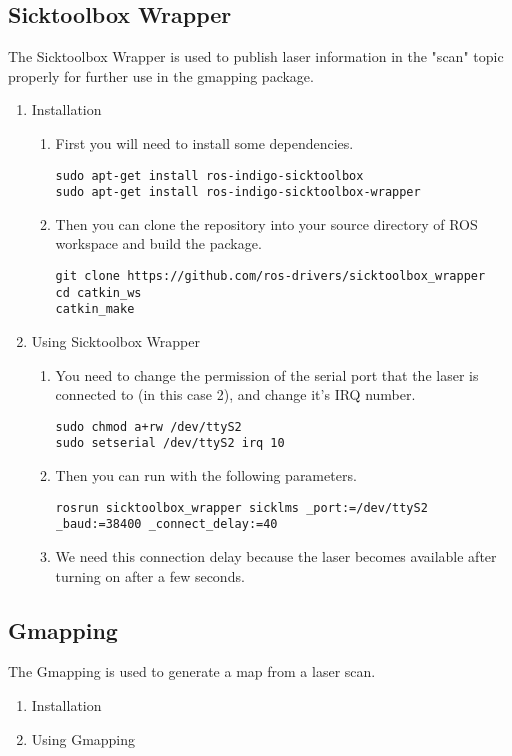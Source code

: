 \documentclass{article}
\begin{document}
\subsection{Sicktoolbox Wrapper}
The Sicktoolbox Wrapper is used to publish laser information in the "scan" topic
properly for further use in the gmapping package.
\begin{enumerate}

\item Installation
\begin{enumerate}
\item First you will need to install some dependencies.
\begin{lstlisting}
sudo apt-get install ros-indigo-sicktoolbox
sudo apt-get install ros-indigo-sicktoolbox-wrapper
\end{lstlisting}
\item Then you can clone the repository into your source directory of ROS
workspace and build the package.
\begin{lstlisting}
git clone https://github.com/ros-drivers/sicktoolbox_wrapper
cd catkin_ws
catkin_make
\end{lstlisting}
\end{enumerate}

\item Using Sicktoolbox Wrapper
\begin{enumerate}
\item You need to change the permission of the serial port that the laser is
connected to (in this case 2), and change it's IRQ number.
\begin{lstlisting}
sudo chmod a+rw /dev/ttyS2
sudo setserial /dev/ttyS2 irq 10
\end{lstlisting}
\item Then you can run with the following parameters.
\begin{lstlisting}
rosrun sicktoolbox_wrapper sicklms _port:=/dev/ttyS2 _baud:=38400 _connect_delay:=40
\end{lstlisting}
\item We need this connection delay because the laser becomes available after
turning on after a few seconds.
\end{enumerate}
\end{enumerate}


\subsection{Gmapping}
The Gmapping is used to generate a map from a laser scan.
\begin{enumerate}

\item Installation
\begin{enumerate}
\end{enumerate}

\item Using Gmapping
\begin{enumerate}
\end{enumerate}
\end{enumerate}
\end{document}
